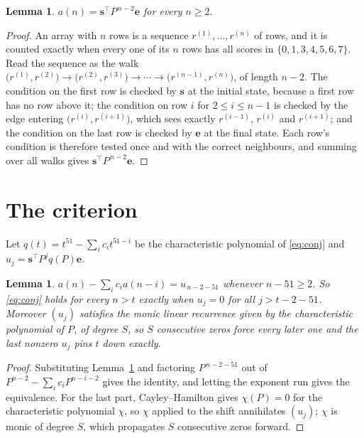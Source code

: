 \documentclass[11pt,a4paper]{article}
\theoremstyle{plain}
\newtheorem{lemma}[theorem]{Lemma}
\theoremstyle{definition}
\begin{document}
\begin{lemma}\label{lem:walk}
$a(n)=\mathbf{s}^{\!\top}P^{\,n-2}\mathbf{e}$ for every $n\ge2$.
\end{lemma}

\begin{proof}
An array with $n$ rows is a sequence $r^{(1)},\dots,r^{(n)}$ of rows, and it is counted
exactly when every one of its $n$ rows has all scores in $\{0,1,3,4,5,6,7\}$. Read the sequence as the
walk $\bigl(r^{(1)},r^{(2)}\bigr)\to\bigl(r^{(2)},r^{(3)}\bigr)\to\cdots\to
\bigl(r^{(n-1)},r^{(n)}\bigr)$, of length $n-2$. The condition on the first row is
checked by $\mathbf{s}$ at the initial state, because a first row has no row above it; the
condition on row $i$ for $2\le i\le n-1$ is checked by the edge entering
$\bigl(r^{(i)},r^{(i+1)}\bigr)$, which sees exactly $r^{(i-1)}$, $r^{(i)}$ and
$r^{(i+1)}$; and the condition on the last row is checked by $\mathbf{e}$ at the final
state. Each row's condition is therefore tested once and with the correct neighbours, and
summing over all walks gives $\mathbf{s}^{\!\top}P^{\,n-2}\mathbf{e}$.
\end{proof}

\section{The criterion}

Let $q(t)=t^{51}-\sum_i c_i t^{51-i}$ be the characteristic polynomial of
\eqref{eq:conj} and $u_j=\mathbf{s}^{\!\top}P^{j}q(P)\mathbf{e}$.

\begin{lemma}\label{lem:crit}
$a(n)-\sum_i c_i a(n-i)=u_{\,n-2-51}$ whenever $n-51\ge2$. So \eqref{eq:conj}
holds for every $n>t$ exactly when $u_j=0$ for all $j>t-2-51$. Moreover $(u_j)$
satisfies the monic linear recurrence given by the characteristic polynomial of $P$, of
degree $S$, so $S$ consecutive zeros force every later one and the last nonzero $u_j$ pins
$t$ down exactly.
\end{lemma}

\begin{proof}
Substituting Lemma~\ref{lem:walk} and factoring $P^{\,n-2-51}$ out of
$P^{n-2}-\sum_i c_i P^{n-i-2}$ gives the identity, and letting the exponent run gives the
equivalence. For the last part, Cayley--Hamilton gives $\chi(P)=0$ for the characteristic
polynomial $\chi$, so $\chi$ applied to the shift annihilates $(u_j)$; $\chi$ is monic of
degree $S$, which propagates $S$ consecutive zeros forward.
\end{proof}
\end{document}
